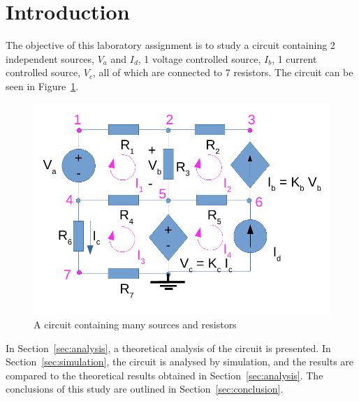 \section{Introduction}
\label{sec:introduction}

The objective of this laboratory assignment is to study a circuit containing 2 independent sources, $V_a$ and $I_d$, 1 voltage controlled source, $I_b$, 1 current controlled source, $V_c$, all of which are connected to 7 resistors. The circuit can be seen in Figure~\ref{fig1}.

\begin{figure}[h] \centering
\includegraphics[width=0.4\linewidth]{t1-1.pdf}
\caption{A circuit containing many sources and resistors}
\label{fig1}
\end{figure}

In Section~\ref{sec:analysis}, a theoretical analysis of the circuit is
presented. In Section~\ref{sec:simulation}, the circuit is analysed by
simulation, and the results are compared to the theoretical results obtained in
Section~\ref{sec:analysis}. The conclusions of this study are outlined in
Section~\ref{sec:conclusion}.
